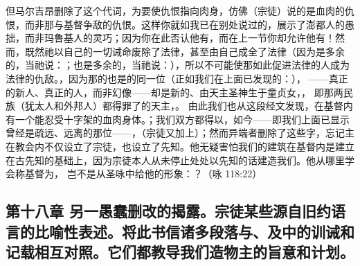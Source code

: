 但马尔吉昂删除了这个代词，为要使仇恨指向肉身，仿佛（宗徒）说的是血肉的仇恨，而非那与基督争敌的仇恨。这样你就如我已在别处说过的，展示了澎都人的愚拙，而非玛鲁基人的灵巧；因为你在此否认他有，而在上一节你却允许他有！然而，既然祂以自己的一切诫命废除了法律，甚至由自己成全了法律（因为是多余的，当祂说：；也是多余的，当祂说：），所以不可能使那如此促进法律的人成为法律的仇敌。，因为那的也是的同一位（正如我们在上面已发现的：）， ——真正的新人、真正的人，而非幻像——却是新的、由天主圣神生于童贞女，， 即那两民族（犹太人和外邦人）都得罪了的天主，。 由此我们也从这段经文发现，在基督内有一个能忍受十字架的血肉身体。；我们双方都得以，如今——即我们上面已显示曾经是疏远、远离的那位——，（宗徒又加上）；然而异端者删除了这些字，忘记主在教会内不仅设立了宗徒，也设立了先知。他无疑害怕我们的建筑在基督内是建立在古先知的基础上，因为宗徒本人从未停止处处以先知的话建造我们。他从哪里学会称基督为， 岂不是从圣咏中给他的形象：？（咏 118:22）\par


\subsection{第十八章 另一愚蠢删改的揭露。宗徒某些源自旧约语言的比喻性表述。将此书信诸多段落与、及中的训诫和记载相互对照。它们都教导我们造物主的旨意和计划。}

